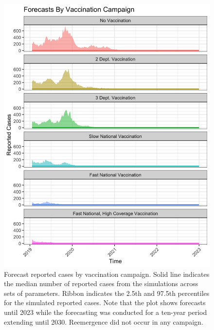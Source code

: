 \documentclass[12pt]{article}
\begin{document}
\begin{figure}[H]
  \centering
  \includegraphics[width=150mm]{fc_plot.png}
  \caption{Forecast reported cases by vaccination campaign. Solid line indicates the median number of reported cases from the simulations across sets of parameters. Ribbon indicates the 2.5th and 97.5th percentiles for the simulated reported cases. Note that the plot shows forecasts until 2023 while the forecasting was conducted for a ten-year period extending until 2030. Reemergence did not occur in any campaign.}
  \label{fig:A2}
\end{figure}
\end{document}
